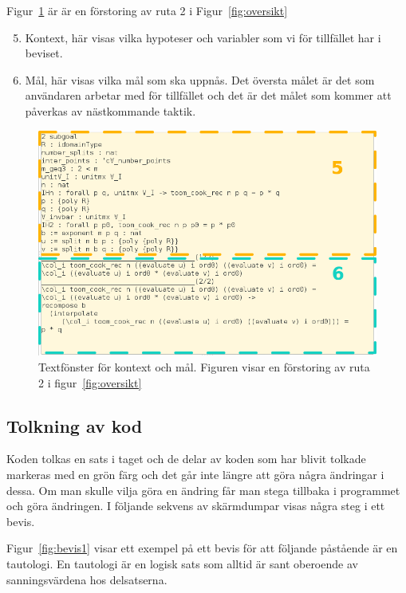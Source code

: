 Figur~\ref{fig:kontext} är är en förstoring av ruta 2 i Figur~\ref{fig:oversikt}
\begin{enumerate}
  \setcounter{enumi}{4}
\item Kontext, här visas vilka hypoteser och variabler som vi för tillfället
  har i beviset.
\item Mål, här visas vilka mål som ska uppnås. Det översta målet är det som
  användaren arbetar med för tillfället och det är det målet som kommer att
  påverkas av nästkommande taktik.
\end{enumerate}

\begin{figure}[H]
  \centering
  \includegraphics[width=150mm]{images/Kontext}
  \caption[Fönster för kontext och mål]
   {Textfönster för kontext och mål. Figuren visar en förstoring av ruta 2 i
    figur~\ref{fig:oversikt}}
  \label{fig:kontext}
\end{figure}

\subsection{Tolkning av kod}
Koden tolkas en sats i taget och de delar av koden som har blivit tolkade
markeras med en grön färg och det går inte längre att göra några ändringar i
dessa. Om man skulle vilja göra en ändring får man stega tillbaka i programmet
och göra ändringen. I följande sekvens av skärmdumpar visas några steg i ett
bevis.

Figur~\ref{fig:bevis1} visar ett exempel på ett bevis för att följande
påstående är en tautologi. En tautologi är en logisk sats som alltid är sant
oberoende av sanningsvärdena hos delsatserna.

